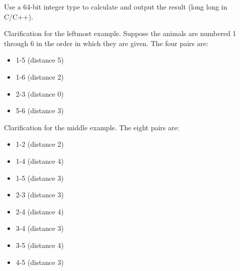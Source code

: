 Use a 64-bit integer type to calculate and output the result (long long in C/C++).

Clarification for the leftmost example. Suppose the animals are numbered 1 through 6 in the order in which they are given. The four pairs are:
\begin{itemize}
\item 1-5 (distance 5)
\item 1-6 (distance 2)
\item 2-3 (distance 0)
\item 5-6 (distance 3)
\end{itemize}

Clarification for the middle example. The eight pairs are:
\begin{itemize}
\item 1-2 (distance 2)
\item 1-4 (distance 4)
\item 1-5 (distance 3)
\item 2-3 (distance 3)
\item 2-4 (distance 4)
\item 3-4 (distance 3)
\item 3-5 (distance 4)
\item 4-5 (distance 3)
\end{itemize}